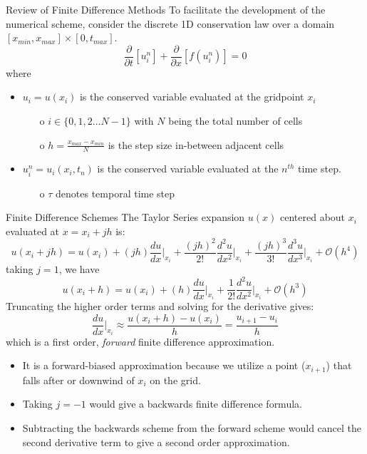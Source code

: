 \documentclass[9pt]{beamer}
\begin{document}
\begin{frame}{Review of Finite Difference Methods}
  To facilitate the development of the numerical scheme, consider the discrete 1D conservation law over a domain $[x_{min},x_{max}] \times [0,t_{max}]$.
  \begin{equation}
    \frac{\partial}{\partial t}[u_i^n] + \frac{\partial}{\partial x}[f(u_i^n)] = 0
  \end{equation}
  where 
  \begin{itemize}
    \item $u_i = u(x_i)$ is the conserved variable evaluated at the gridpoint $x_i$
    \begin{itemize}
      \item[o]  $i \in \{0,1,2 \dots N-1\}$ with $N$ being the total number of cells
      \item[o] $h = \frac{x_{max} - x_{min}}{N}$ is the step size in-between adjacent cells
    \end{itemize}
    \item $u_i^n = u_i(x_i,t_n)$ is the conserved variable evaluated at the $n^{th}$ time step.
    \begin{itemize}
      \item[o] $\tau$ denotes temporal time step 
    \end{itemize}
  \end{itemize}
\end{frame}

\begin{frame}{Finite Difference Schemes}
  The Taylor Series expansion $u(x)$ centered about $x_i$ evaluated at $x=x_i + jh$ is:
  \begin{equation}
    u(x_i+jh)=u(x_i)+(jh)\frac{d u}{dx}\bigg|_{x_i}+\frac{(jh)^2}{2!}\frac{d^2u}{dx^2}\bigg|_{x_i} + \frac{(jh)^3}{3!}\frac{d^3u}{dx^3}\bigg|_{x_i} + \mathcal{O}(h^4)
  \end{equation}
  taking $j=1$, we have 
  \begin{equation}
    u(x_i+h)=u(x_i)+(h)\frac{d u}{dx}\bigg|_{x_i}+ \frac{1}{2!}\frac{d^2u}{dx^2}\bigg|_{x_i}+ \mathcal{O}(h^3)
  \end{equation}
  Truncating the higher order terms and solving for the derivative gives:
  \begin{equation}
    \frac{d u}{dx}\bigg|_{x_i} \approx \frac{u(x_i+h) - u(x_i)}{h} = \frac{u_{i+1} - u_i}{h}
  \end{equation}
  which is a first order, \textit{forward} finite difference approximation.
  \begin{itemize}
    \item It is a forward-biased approximation because we utilize a point ($x_{i+1}$) that falls after or downwind of $x_i$ on the grid.
    \item Taking $j=-1$ would give a backwards finite difference formula.
    \item Subtracting the backwards scheme from the forward scheme would cancel the second derivative term to give a second order approximation.
  \end{itemize}
\end{frame}
\end{document}
